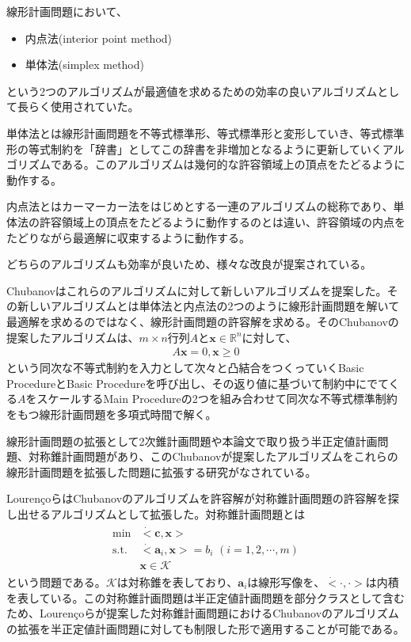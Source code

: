 線形計画問題において、
\begin{itemize}
  \item 内点法(interior point method)
  \item 単体法(simplex method)
\end{itemize}
という2つのアルゴリズムが最適値を求めるための効率の良いアルゴリズムとして長らく使用されていた。

単体法とは線形計画問題を不等式標準形、等式標準形と変形していき、等式標準形の等式制約を「辞書」としてこの辞書を非増加となるように更新していくアルゴリズムである。このアルゴリズムは幾何的な許容領域上の頂点をたどるように動作する。

内点法とはカーマーカー法をはじめとする一連のアルゴリズムの総称であり、単体法の許容領域上の頂点をたどるように動作するのとは違い、許容領域の内点をたどりながら最適解に収束するように動作する。

どちらのアルゴリズムも効率が良いため、様々な改良が提案されている\cite*{Optimization}\cite*{InteriorPointMethod}。

Chubanovはこれらのアルゴリズムに対して新しいアルゴリズムを提案した\cite*{Chubanov}。その新しいアルゴリズムとは単体法と内点法の2つのように線形計画問題を解いて最適解を求めるのではなく、線形計画問題の許容解を求める。そのChubanovの提案したアルゴリズムは、$m \times n$行列$A$と$\mathbf{x} \in \mathbb{R}^n$に対して、
\begin{align*}
  A \mathbf{x} = 0, \mathbf{x} \geq 0
\end{align*}
という同次な不等式制約を入力として次々と凸結合をつくっていくBasic ProcedureとBasic Procedureを呼び出し、その返り値に基づいて制約中にでてくる$A$をスケールするMain Procedureの2つを組み合わせて同次な不等式標準制約をもつ線形計画問題を多項式時間で解く。

線形計画問題の拡張として2次錐計画問題や本論文で取り扱う半正定値計画問題、対称錐計画問題があり、このChubanovが提案したアルゴリズムをこれらの線形計画問題を拡張した問題に拡張する研究がなされている\cite*{SOCP}\cite*{SymmetricCone}。

Louren\c{c}oらはChubanovのアルゴリズムを許容解が対称錐計画問題の許容解を探し出せるアルゴリズムとして拡張した\cite*{SymmetricCone}。対称錐計画問題とは
\begin{align*}
  \begin{array}{ll}
    \text{min}  & \dot<\mathbf{c}, \mathbf{x}> \\
    \text{s.t.} & \dot<\mathbf{a}_i, \mathbf{x}> = b_i \,\, (i = 1, 2, \cdots, m) \\
                & \mathbf{x} \in \mathcal{K}
  \end{array}
\end{align*}
という問題である。$\mathcal{K}$は対称錐を表しており、$\mathbf{a}_i$は線形写像を、$\dot<\cdot, \cdot>$は内積を表している。この対称錐計画問題は半正定値計画問題を部分クラスとして含むため、Louren\c{c}oらが提案した対称錐計画問題におけるChubanovのアルゴリズムの拡張を半正定値計画問題に対しても制限した形で適用することが可能である。

